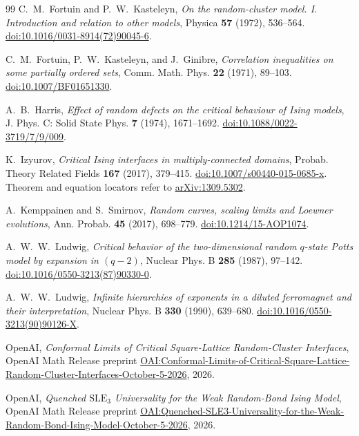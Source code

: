 \begin{thebibliography}{99}
C.~M.~Fortuin and P.~W.~Kasteleyn,
\emph{On the random-cluster model. I. Introduction and relation to other models},
Physica \textbf{57} (1972), 536--564.
\href{https://doi.org/10.1016/0031-8914(72)90045-6}{doi:10.1016/0031-8914(72)90045-6}.

C.~M.~Fortuin, P.~W.~Kasteleyn, and J.~Ginibre,
\emph{Correlation inequalities on some partially ordered sets},
Comm. Math. Phys. \textbf{22} (1971), 89--103.
\href{https://doi.org/10.1007/BF01651330}{doi:10.1007/BF01651330}.

A.~B.~Harris,
\emph{Effect of random defects on the critical behaviour of Ising models},
J. Phys. C: Solid State Phys. \textbf{7} (1974), 1671--1692.
\href{https://doi.org/10.1088/0022-3719/7/9/009}{doi:10.1088/0022-3719/7/9/009}.

K.~Izyurov,
\emph{Critical Ising interfaces in multiply-connected domains},
Probab. Theory Related Fields \textbf{167} (2017), 379--415.
\href{https://doi.org/10.1007/s00440-015-0685-x}{doi:10.1007/s00440-015-0685-x}.
Theorem and equation locators refer to
\href{https://arxiv.org/abs/1309.5302}{arXiv:1309.5302}.

A.~Kemppainen and S.~Smirnov,
\emph{Random curves, scaling limits and Loewner evolutions},
Ann. Probab. \textbf{45} (2017), 698--779.
\href{https://doi.org/10.1214/15-AOP1074}{doi:10.1214/15-AOP1074}.

A.~W.~W.~Ludwig,
\emph{Critical behavior of the two-dimensional random $q$-state Potts model by expansion in $(q-2)$},
Nuclear Phys. B \textbf{285} (1987), 97--142.
\href{https://doi.org/10.1016/0550-3213(87)90330-0}{doi:10.1016/0550-3213(87)90330-0}.

A.~W.~W.~Ludwig,
\emph{Infinite hierarchies of exponents in a diluted ferromagnet and their interpretation},
Nuclear Phys. B \textbf{330} (1990), 639--680.
\href{https://doi.org/10.1016/0550-3213(90)90126-X}{doi:10.1016/0550-3213(90)90126-X}.

OpenAI,
\emph{Conformal Limits of Critical Square-Lattice Random-Cluster Interfaces},
OpenAI Math Release preprint
\href{https://github.com/openai/math/blob/main/preprints/Conformal-Limits-of-Critical-Square-Lattice-Random-Cluster-Interfaces-October-5-2026/paper.pdf}{OAI:Conformal-Limits-of-Critical-Square-Lattice-Random-Cluster-Interfaces-October-5-2026},
2026.

OpenAI,
\emph{Quenched $\mathrm{SLE}_3$ Universality for the Weak Random-Bond Ising Model},
OpenAI Math Release preprint
\href{https://github.com/openai/math/blob/main/preprints/Quenched-SLE3-Universality-for-the-Weak-Random-Bond-Ising-Model-October-5-2026/quenched-sle3-weak-random-bond-ising.pdf}{OAI:Quenched-SLE3-Universality-for-the-Weak-Random-Bond-Ising-Model-October-5-2026},
2026.


\end{thebibliography}
